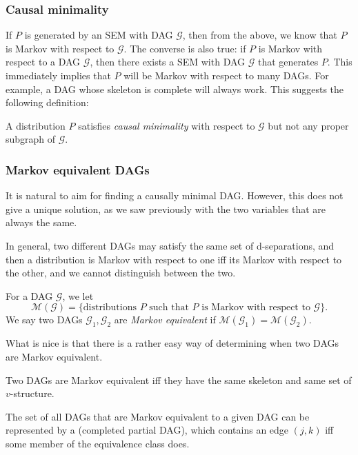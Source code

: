 \documentclass[a4paper]{article}
\begin{document}
\subsubsection*{Causal minimality}
If $P$ is generated by an SEM with DAG $\mathcal{G}$, then from the above, we know that $P$ is Markov with respect to $\mathcal{G}$. The converse is also true: if $P$ is Markov with respect to a DAG $\mathcal{G}$, then there exists a SEM with DAG $\mathcal{G}$ that generates $P$. This immediately implies that $P$ will be Markov with respect to many DAGs. For example, a DAG whose skeleton is complete will always work. This suggests the following definition:

\begin{defi}
  A distribution $P$ satisfies \emph{causal minimality} with respect to $\mathcal{G}$ but not any proper subgraph of $\mathcal{G}$.
\end{defi}

\subsubsection*{Markov equivalent DAGs}

It is natural to aim for finding a causally minimal DAG. However, this does not give a unique solution, as we saw previously with the two variables that are always the same.

In general, two different DAGs may satisfy the same set of d-separations, and then a distribution is Markov with respect to one iff its Markov with respect to the other, and we cannot distinguish between the two.

\begin{defi}
  For a DAG $\mathcal{G}$, we let
  \[
    \mathcal{M}(\mathcal{G}) = \{\text{distributions $P$ such that $P$ is Markov with respect to $\mathcal{G}$}\}.
  \]
  We say two DAGs $\mathcal{G}_1, \mathcal{G}_2$ are \emph{Markov equivalent} if $\mathcal{M}(\mathcal{G}_1) = \mathcal{M}(\mathcal{G}_2)$.
\end{defi}
What is nice is that there is a rather easy way of determining when two DAGs are Markov equivalent.

\begin{prop}
  Two DAGs are Markov equivalent iff they have the same skeleton and same set of $v$-structure.
\end{prop}
The set of all DAGs that are Markov equivalent to a given DAG can be represented by a  (completed partial DAG), which contains an edge $(j, k)$ iff some member of the equivalence class does.
\end{document}
